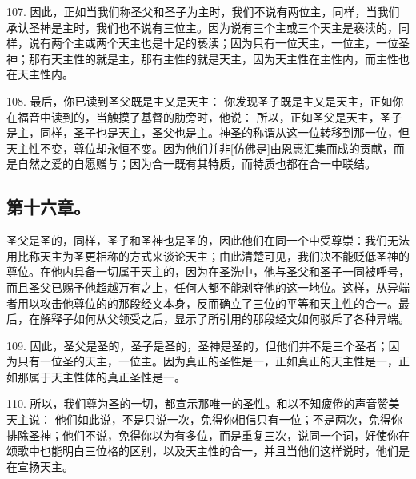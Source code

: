 107. 因此，正如当我们称圣父和圣子为主时，我们不说有两位主，同样，当我们承认圣神是主时，我们也不说有三位主。因为说有三个主或三个天主是亵渎的，同样，说有两个主或两个天主也是十足的亵渎；因为只有一位天主，一位主，一位圣神；那有天主性的就是主，那有主性的就是天主，因为天主性在主性内，而主性也在天主性内。\par

108. 最后，你已读到圣父既是主又是天主： 你发现圣子既是主又是天主，正如你在福音中读到的，当触摸了基督的肋旁时，他说：  所以，正如圣父是天主，圣子是主，同样，圣子也是天主，圣父也是主。神圣的称谓从这一位转移到那一位，但天主性不变，尊位却永恒不变。因为他们并非[仿佛是]由恩惠汇集而成的贡献，而是自然之爱的自愿赠与；因为合一既有其特质，而特质也都在合一中联结。\par


\subsection{第十六章。}

圣父是圣的，同样，圣子和圣神也是圣的，因此他们在同一个中受尊崇：我们无法用比称天主为圣更相称的方式来谈论天主；由此清楚可见，我们决不能贬低圣神的尊位。在他内具备一切属于天主的，因为在圣洗中，他与圣父和圣子一同被呼号，而且圣父已赐予他超越万有之上，任何人都不能剥夺他的这一地位。这样，从异端者用以攻击他尊位的的那段经文本身，反而确立了三位的平等和天主性的合一。最后，在解释子如何从父领受之后，显示了所引用的那段经文如何驳斥了各种异端。\par

109. 因此，圣父是圣的，圣子是圣的，圣神是圣的，但他们并不是三个圣者；因为只有一位圣的天主，一位主。因为真正的圣性是一，正如真正的天主性是一，正如那属于天主性体的真正圣性是一。\par

110. 所以，我们尊为圣的一切，都宣示那唯一的圣性。和以不知疲倦的声音赞美天主说：  他们如此说，不是只说一次，免得你相信只有一位；不是两次，免得你排除圣神；他们不说，免得你以为有多位，而是重复三次，说同一个词，好使你在颂歌中也能明白三位格的区别，以及天主性的合一，并且当他们这样说时，他们是在宣扬天主。\par

